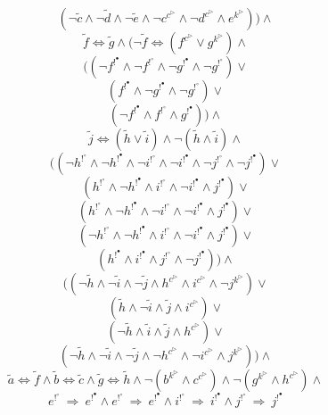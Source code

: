 \begin{BehExample}
      $$(\neg \tilde{c} \wedge \neg \tilde{d} \wedge \neg \tilde{e} \wedge \neg c^{c^\triangleright} \wedge \neg d^{c^\triangleright} \wedge e^{k^\triangleright})) \wedge $$ 
      $$\tilde{f} \Leftrightarrow \tilde{g}  \wedge (\neg \tilde{f} \Leftrightarrow (f^{c^\triangleright} \vee g^{k^\triangleright}) \wedge$$
      $$((\neg f^{!^\bullet} \wedge \neg f^{!^\circ} \wedge \neg g^{!^\bullet} \wedge \neg g^{!^\circ}) \vee $$
      $$(f^{!^\bullet} \wedge \neg g^{!^\bullet} \wedge \neg g^{!^\circ}) \vee $$
      $$(\neg f^{!^\bullet} \wedge f^{!^\circ} \wedge g^{!^\bullet})) \wedge $$
%
      $$\tilde{j} \Leftrightarrow (\tilde{h} \vee \tilde{i}) \wedge \neg (\tilde{h} \wedge \tilde{i}) \wedge$$
%      
      $$ ((\neg h^{!^\circ} \wedge \neg h^{!^\bullet} \wedge \neg i^{!^\circ} \wedge \neg i^{!^\bullet} \wedge \neg j^{!^\circ} \wedge \neg j^{!^\bullet}) \vee $$
      $$ (h^{!^\circ} \wedge \neg h^{!^\bullet} \wedge i^{!^\circ} \wedge \neg i^{!^\bullet} \wedge j^{!^\bullet}) \vee $$
      $$ (h^{!^\circ} \wedge \neg h^{!^\bullet} \wedge \neg i^{!^\circ} \wedge \neg i^{!^\bullet} \wedge j^{!^\bullet}) \vee $$
      $$ (\neg h^{!^\circ} \wedge \neg h^{!^\bullet} \wedge i^{!^\circ} \wedge \neg i^{!^\bullet} \wedge j^{!^\bullet}) \vee $$
      $$ (h^{!^\bullet} \wedge i^{!^\bullet} \wedge j^{!^\circ} \wedge \neg j^{!^\bullet})) \wedge $$
%
$$((\neg \tilde{h} \wedge \neg \tilde{i} \wedge \neg \tilde{j} \wedge h^{c^\triangleright} \wedge i^{c^\triangleright} \wedge \neg j^{k^\triangleright}) \vee $$ 
$$(\tilde{h} \wedge \neg \tilde{i} \wedge \tilde{j} \wedge i^{c^\triangleright}) \vee $$
$$(\neg \tilde{h} \wedge \tilde{i} \wedge \tilde{j} \wedge h^{c^\triangleright}) \vee $$ 
$$(\neg \tilde{h} \wedge \neg \tilde{i} \wedge \neg \tilde{j} \wedge \neg h^{c^\triangleright} \wedge \neg i^{c^\triangleright} \wedge j^{k^\triangleright})) \wedge $$ 
%
%
      $$\tilde{a} \Leftrightarrow \tilde{f} \wedge \tilde{b} \Leftrightarrow \tilde{c} \wedge \tilde{g} \Leftrightarrow \tilde{h} \wedge \neg (b^{k^\triangleright} \wedge c^{c^\triangleright})  \wedge \neg (g^{k^\triangleright} \wedge h^{c^\triangleright})  \wedge $$
      $$ e^{!^\circ}\ \Rightarrow\ e^{!^\bullet} \wedge e^{!^\circ}\ \Rightarrow\ e^{!^\bullet} \wedge 
      	i^{!^\circ}\ \Rightarrow\ i^{!^\bullet} \wedge j^{!^\circ}\ \Rightarrow\ j^{!^\bullet}$$
      

\end{BehExample}
